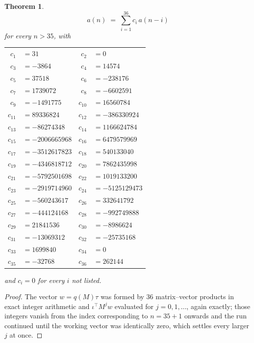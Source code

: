 \documentclass[11pt,a4paper]{article}
\theoremstyle{plain}
\newtheorem{theorem}{Theorem}
\theoremstyle{definition}
\begin{document}
\begin{theorem}
\[
a(n)\;=\;\sum_{i=1}^{36}c_i\,a(n-i)
\]
for every $n>35$, with
\begin{center}\footnotesize
\begin{tabular}{r@{\,}l@{\qquad}r@{\,}l}
$c_{1}$ & $=31$ & $c_{2}$ & $=0$ \\
$c_{3}$ & $=-3864$ & $c_{4}$ & $=14574$ \\
$c_{5}$ & $=37518$ & $c_{6}$ & $=-238176$ \\
$c_{7}$ & $=1739072$ & $c_{8}$ & $=-6602591$ \\
$c_{9}$ & $=-1491775$ & $c_{10}$ & $=16560784$ \\
$c_{11}$ & $=89336824$ & $c_{12}$ & $=-386330924$ \\
$c_{13}$ & $=-86274348$ & $c_{14}$ & $=1166624784$ \\
$c_{15}$ & $=-2006665968$ & $c_{16}$ & $=6479579969$ \\
$c_{17}$ & $=-3512617823$ & $c_{18}$ & $=540133040$ \\
$c_{19}$ & $=-4346818712$ & $c_{20}$ & $=7862435998$ \\
$c_{21}$ & $=-5792501698$ & $c_{22}$ & $=1019133200$ \\
$c_{23}$ & $=-2919714960$ & $c_{24}$ & $=-5125129473$ \\
$c_{25}$ & $=-560243617$ & $c_{26}$ & $=332641792$ \\
$c_{27}$ & $=-444124168$ & $c_{28}$ & $=-992749888$ \\
$c_{29}$ & $=21841536$ & $c_{30}$ & $=-8986624$ \\
$c_{31}$ & $=-13069312$ & $c_{32}$ & $=-25735168$ \\
$c_{33}$ & $=1699840$ & $c_{34}$ & $=0$ \\
$c_{35}$ & $=-32768$ & $c_{36}$ & $=262144$ \\
\end{tabular}
\end{center}
and $c_i=0$ for every $i$ not listed.
\end{theorem}

\begin{proof}
The vector $w=q(M)\tau$ was formed by $36$ matrix--vector products in exact integer
arithmetic and $\iota^{\!\top}M^{j}w$ evaluated for $j=0,1,\dots$, again exactly; those
integers vanish from the index corresponding to $n=35+1$ onwards and the run continued
until the working vector was identically zero, which settles every larger $j$ at once.
\end{proof}
\end{document}
